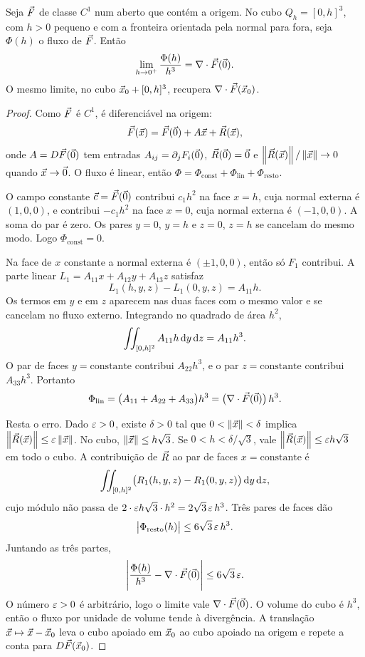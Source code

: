 \documentclass[11pt,a4paper]{article}
\begin{document}
\begin{proposicao}
\label{prop:limite-div}
Seja $\vec{F}$ de classe $C^1$ num aberto que contém a origem. No cubo $Q_h=[0,h]^3$, com $h>0$ pequeno e com a fronteira orientada pela normal para fora, seja $\Phi(h)$ o fluxo de $\vec{F}$. Então
\[
\lim_{h\to 0^+}\frac{\Phi(h)}{h^3}=\nabla\cdot\vec{F}(\vec{0}).
\]
O mesmo limite, no cubo $\vec{x}_0+[0,h]^3$, recupera $\nabla\cdot\vec{F}(\vec{x}_0)$.
\end{proposicao}

\begin{proof}
Como $\vec{F}$ é $C^1$, é diferenciável na origem:
\[
\vec{F}(\vec{x})=\vec{F}(\vec{0})+A\vec{x}+\vec{R}(\vec{x}),
\]
onde $A=D\vec{F}(\vec{0})$ tem entradas $A_{ij}=\partial_j F_i(\vec{0})$, $\vec{R}(\vec{0})=\vec{0}$ e $\left\lVert \vec{R}(\vec{x}) \right\rVert/\left\lVert \vec{x} \right\rVert\to 0$ quando $\vec{x}\to\vec{0}$. O fluxo é linear, então $\Phi=\Phi_{\mathrm{const}}+\Phi_{\mathrm{lin}}+\Phi_{\mathrm{resto}}$.

O campo constante $\vec{c}=\vec{F}(\vec{0})$ contribui $c_1 h^2$ na face $x=h$, cuja normal externa é $(1,0,0)$, e contribui $-c_1 h^2$ na face $x=0$, cuja normal externa é $(-1,0,0)$. A soma do par é zero. Os pares $y=0$, $y=h$ e $z=0$, $z=h$ se cancelam do mesmo modo. Logo $\Phi_{\mathrm{const}}=0$.

Na face de $x$ constante a normal externa é $(\pm 1,0,0)$, então só $F_1$ contribui. A parte linear $L_1=A_{11}x+A_{12}y+A_{13}z$ satisfaz
\[
L_1(h,y,z)-L_1(0,y,z)=A_{11}h.
\]
Os termos em $y$ e em $z$ aparecem nas duas faces com o mesmo valor e se cancelam no fluxo externo. Integrando no quadrado de área $h^2$,
\[
\iint_{[0,h]^2} A_{11}h\,\mathrm{d} y\,\mathrm{d} z=A_{11}h^3.
\]
O par de faces $y=\mathrm{constante}$ contribui $A_{22}h^3$, e o par $z=\mathrm{constante}$ contribui $A_{33}h^3$. Portanto
\[
\Phi_{\mathrm{lin}}=\bigl(A_{11}+A_{22}+A_{33}\bigr)h^3
=\bigl(\nabla\cdot\vec{F}(\vec{0})\bigr)\,h^3.
\]

Resta o erro. Dado $\varepsilon>0$, existe $\delta>0$ tal que $0<\left\lVert \vec{x} \right\rVert<\delta$ implica $\left\lVert \vec{R}(\vec{x}) \right\rVert\le\varepsilon\left\lVert \vec{x} \right\rVert$. No cubo, $\left\lVert \vec{x} \right\rVert\le h\sqrt{3}$. Se $0<h<\delta/\sqrt{3}$, vale $\left\lVert \vec{R}(\vec{x}) \right\rVert\le\varepsilon h\sqrt{3}$ em todo o cubo. A contribuição de $\vec{R}$ ao par de faces $x=\mathrm{constante}$ é
\[
\iint_{[0,h]^2}\bigl(R_1(h,y,z)-R_1(0,y,z)\bigr)\,\mathrm{d} y\,\mathrm{d} z,
\]
cujo módulo não passa de $2\cdot\varepsilon h\sqrt{3}\cdot h^2=2\sqrt{3}\,\varepsilon\, h^3$. Três pares de faces dão
\[
\bigl|\Phi_{\mathrm{resto}}(h)\bigr|\le 6\sqrt{3}\,\varepsilon\, h^3.
\]
Juntando as três partes,
\[
\Biggl|\frac{\Phi(h)}{h^3}-\nabla\cdot\vec{F}(\vec{0})\Biggr|\le 6\sqrt{3}\,\varepsilon.
\]
O número $\varepsilon>0$ é arbitrário, logo o limite vale $\nabla\cdot\vec{F}(\vec{0})$. O volume do cubo é $h^3$, então o fluxo por unidade de volume tende à divergência. A translação $\vec{x}\mapsto\vec{x}-\vec{x}_0$ leva o cubo apoiado em $\vec{x}_0$ ao cubo apoiado na origem e repete a conta para $D\vec{F}(\vec{x}_0)$.
\end{proof}
\end{document}
